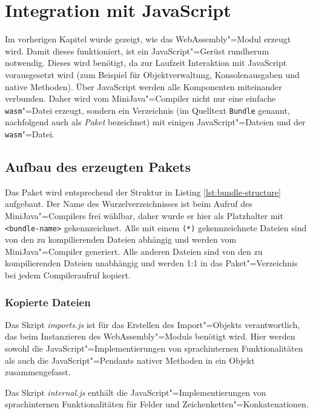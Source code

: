 \chapter{Integration mit JavaScript}
\label{cha:JavaScript-Integration}

Im vorherigen Kapitel wurde gezeigt, wie das WebAssembly"=Modul erzeugt wird.
Damit dieses funktioniert, ist ein JavaScript"=Gerüst rundherum notwendig. Dieses wird benötigt, da zur Laufzeit Interaktion mit JavaScript vorausgesetzt wird (zum Beispiel für Objektverwaltung, Konsolenausgaben und native Methoden). Über JavaScript werden alle Komponenten miteinander verbunden. Daher wird vom MiniJava"=Compiler nicht nur eine einfache \lstinline{wasm}"=Datei erzeugt, sondern ein Verzeichnis (im Quelltext \lstinline{Bundle} genannt, nachfolgend auch als \emph{Paket} bezeichnet) mit einigen JavaScript"=Dateien und der \lstinline{wasm}"=Datei.

\section{Aufbau des erzeugten Pakets}

Das Paket wird entsprechend der Struktur in Listing \ref{lst:bundle-structure} aufgebaut. Der Name des Wurzelverzeichnisses ist beim Aufruf des MiniJava"=Compilers frei wählbar, daher wurde er hier als Platzhalter mit \lstinline{<bundle-name>} gekennzeichnet. Alle mit einem \lstinline{(*)} gekennzeichnete Dateien sind von den zu kompilierenden Dateien abhängig und werden vom MiniJava"=Compiler generiert. Alle anderen Dateien sind von den zu kompilierenden Dateien unabhängig und werden 1:1 in das Paket"=Verzeichnis bei jedem Compileraufruf kopiert.



\subsection{Kopierte Dateien}

Das Skript \emph{imports.js} ist für das Erstellen des Import"=Objekts verantwortlich, das beim Instanzieren des WebAssembly"=Moduls benötigt wird. Hier werden sowohl die JavaScript"=Implementierungen von sprachinternen Funktionalitäten als auch die JavaScript"=Pendants nativer Methoden in ein Objekt zusammengefasst.

Das Skript \emph{internal.js} enthält die JavaScript"=Implementierungen von sprachinternen Funktionalitäten für Felder und Zeichenketten"=Konkatenationen.


